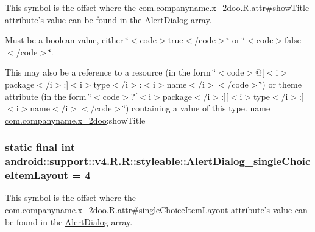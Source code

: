 This symbol is the offset where the \hyperlink{classcom_1_1companyname_1_1x__2doo_1_1_r_1_1attr_7ae7cd69155b1a6e4c15c710e5357461}{com.companyname.x\_\-2doo.R.attr\#showTitle} attribute's value can be found in the \hyperlink{classandroid_1_1support_1_1v4_1_1_r_1_1styleable_984adead369fc9c6b58c85f88690832f}{AlertDialog} array.

Must be a boolean value, either \char`\"{}$<$code$>$true$<$/code$>$\char`\"{} or \char`\"{}$<$code$>$false$<$/code$>$\char`\"{}. 

This may also be a reference to a resource (in the form \char`\"{}$<$code$>$@\mbox{[}$<$i$>$package$<$/i$>$:\mbox{]}$<$i$>$type$<$/i$>$:$<$i$>$name$<$/i$>$$<$/code$>$\char`\"{}) or theme attribute (in the form \char`\"{}$<$code$>$?\mbox{[}$<$i$>$package$<$/i$>$:\mbox{]}\mbox{[}$<$i$>$type$<$/i$>$:\mbox{]}$<$i$>$name$<$/i$>$$<$/code$>$\char`\"{}) containing a value of this type.  name \hyperlink{namespacecom_1_1companyname_1_1x__2doo}{com.companyname.x\_\-2doo}:showTitle \hypertarget{classandroid_1_1support_1_1v4_1_1_r_1_1styleable_448e0ef41be3c7030dcffa62d3922bfb}{
\subsubsection[{AlertDialog\_\-singleChoiceItemLayout}]{\setlength{\rightskip}{0pt plus 5cm}static final int android::support::v4.R.R::styleable::AlertDialog\_\-singleChoiceItemLayout = 4}}
\label{classandroid_1_1support_1_1v4_1_1_r_1_1styleable_448e0ef41be3c7030dcffa62d3922bfb}


This symbol is the offset where the \hyperlink{classcom_1_1companyname_1_1x__2doo_1_1_r_1_1attr_de7601fbaca8e284824a49641ce1e3ac}{com.companyname.x\_\-2doo.R.attr\#singleChoiceItemLayout} attribute's value can be found in the \hyperlink{classandroid_1_1support_1_1v4_1_1_r_1_1styleable_984adead369fc9c6b58c85f88690832f}{AlertDialog} array.


